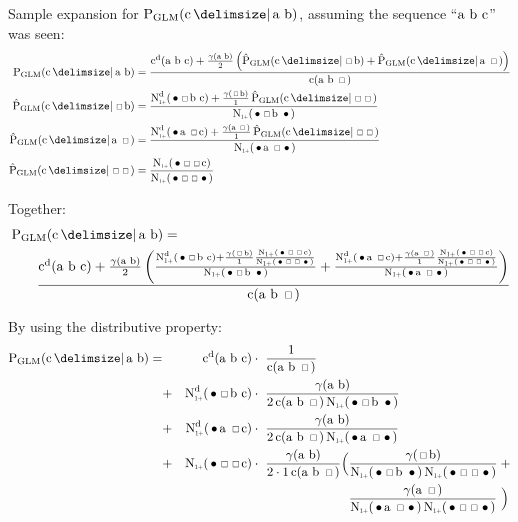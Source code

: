 \newcommand{\ProbGLMcab}[2]
  {\frac{\DiscountedCount(\text{a b c}) + \frac{\gamma(\text{a b})}{2}\left(#1 + #2\right)}{\Count(\text{a b \Skp})}}
\newcommand{\ProbGLMcsb}[1]
  {\frac{\DiscountedCount*(\text{\WSkp \Skp b c}) + \frac{\gamma(\text{\Skp b})}{1} #1}{\ContCountIp(\text{\WSkp \Skp b \WSkp})}}
\newcommand{\ProbGLMcas}[1]
  {\frac{\DiscountedCount*(\text{\WSkp a \Skp c}) + \frac{\gamma(\text{a \Skp})}{1} #1}{\ContCountIp(\text{\WSkp a \Skp \WSkp})}}
\newcommand{\ProbGLMcss}
  {\frac{\ContCountIp(\text{\WSkp \Skp \Skp c})}{\ContCountIp(\text{\WSkp \Skp \Skp \WSkp})}}

Sample expansion for $\ProbGLM{\text{c}}{\text{a b}}$, assuming the sequence
``$\text{\text{a b c}}$'' was seen:
\begin{align}
  \ProbGLM {\text{c}}{\text{a b}}       &= \ProbGLMcab{\ProbGLM*{\text{c}}{\text{\Skp b}}}{\ProbGLM*{\text{c}}{\text{a \Skp}}} \\ \ProbGLM*{\text{c}}{\text{\Skp b}}    &= \ProbGLMcsb{\ProbGLM*{\text{c}}{\text{\Skp \Skp}}} \\
  \ProbGLM*{\text{c}}{\text{a \Skp}}    &= \ProbGLMcas{\ProbGLM*{\text{c}}{\text{\Skp \Skp}}} \\
  \ProbGLM*{\text{c}}{\text{\Skp \Skp}} &= \ProbGLMcss
\end{align}

Together:
\begin{align}
  &\ProbGLM{\text{c}}{\text{a b}} =\\
  &\qquad \ProbGLMcab{\ProbGLMcsb{\ProbGLMcss}}
                     {\ProbGLMcas{\ProbGLMcss}} \nonumber
\end{align}

By using the distributive property:
\begin{align}
  \ProbGLM {\text{c}}{\text{a b}} =
    & & \DiscountedCount (\text{a b c})          &             \cdot\  \frac{1}{\Count(\text{a b \Skp})} \\
    &+& \DiscountedCount*(\text{\WSkp \Skp b c}) &             \cdot\  \frac{\gamma(\text{a b})}{2 \Count(\text{a b \Skp}) \ContCountIp(\text{\WSkp \Skp b \WSkp})} \nonumber \\
    &+& \DiscountedCount*(\text{\WSkp a \Skp c}) &             \cdot\  \frac{\gamma(\text{a b})}{2 \Count(\text{a b \Skp}) \ContCountIp(\text{\WSkp a \Skp \WSkp})} \nonumber \\
    &+& \ContCountIp(\text{\WSkp\Skp \Skp c})    &             \cdot\  \frac{\gamma(\text{a b})}{2 \cdot 1 \Count(\text{a b \Skp})} \Big(  \frac{\gamma(\text{\Skp b})}{\ContCountIp(\text{\WSkp \Skp b \WSkp}) \ContCountIp(\text{\WSkp \Skp \Skp \WSkp})} \: + \nonumber \\
    & &                                          & \phantom{{} \cdot\  \frac{\gamma(\text{a b})}{2 \cdot 1 \Count(\text{a b \Skp})} \Big(} \frac{\gamma(\text{a \Skp})}{\ContCountIp(\text{\WSkp a \Skp \WSkp}) \ContCountIp(\text{\WSkp \Skp \Skp \WSkp})} \ \Big) \nonumber
\end{align}
